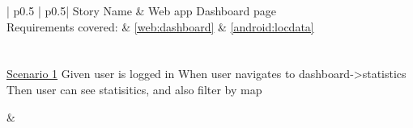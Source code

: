 \begin{longtable}{| p{} | p{}|}
	\hline
	\newline Story Name & \newline Web app Dashboard page\\\hline
	\newline Requirements covered: & \newline \ref{web:dashboard} \& \ref{android:locdata}\\\hline
	\\\hline
	\\\hline
	\newline\underline{Scenario 1}\newline
	Given user is logged in\newline
	When user navigates to dashboard->statistics \newline 
	Then user can see statisitics, and also filter by map\newline
	
	&
	\\\hline
\end{longtable}